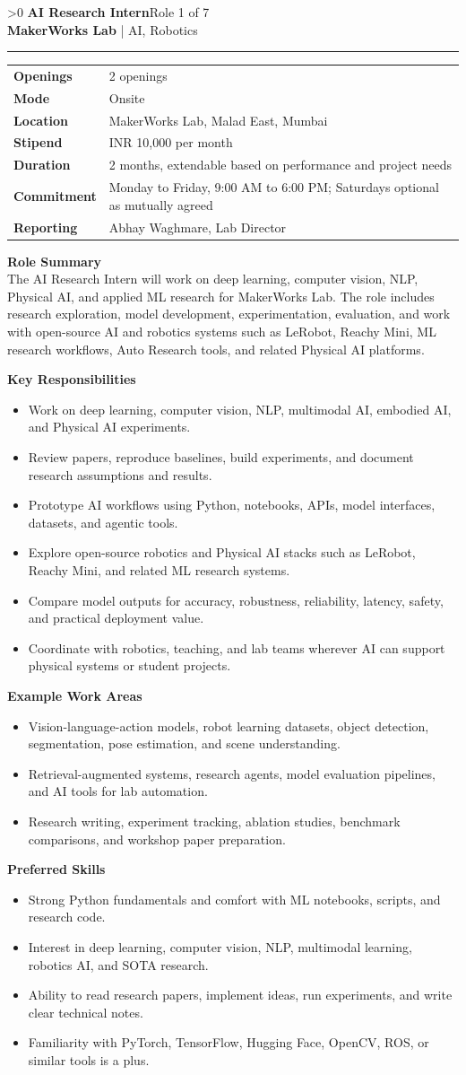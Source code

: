 \documentclass[10pt,a4paper]{article}
\newcommand{\CommonLocation}{MakerWorks Lab, Malad East, Mumbai}
\newcommand{\CommonStipend}{INR 10,000 per month}
\newcommand{\CommonDuration}{2 months, extendable based on performance and project needs}
\newcommand{\CommonCommitment}{Monday to Friday, 9:00 AM to 6:00 PM; Saturdays optional as mutually agreed}
\newcommand{\CommonReporting}{Abhay Waghmare, Lab Director}
\newcounter{rolepage}
\newcommand{\RolePage}[3]{%
  \ifnum\value{rolepage}>0\clearpage\fi
  \stepcounter{rolepage}
  \thispagestyle{plain}
  {\Large\textbf{#1}}\hfill{\small #2}\\
  {\small\textbf{MakerWorks Lab} | AI, Robotics}\\[4pt]
  \hrule
  \vspace{6pt}
  #3
}
\newcommand{\DetailsTable}[3]{%
\begin{tabularx}{\linewidth}{>{\bfseries}p{30mm}X}
Openings & #3 \\
Mode & #1 \\
Location & #2 \\
Stipend & \CommonStipend \\
Duration & \CommonDuration \\
Commitment & \CommonCommitment \\
Reporting & \CommonReporting \\
\end{tabularx}
}
\newcommand{\RoleSection}[1]{\vspace{5pt}\par\noindent\textbf{#1}\par\vspace{2pt}}
\begin{document}
\small

\RolePage{AI Research Intern}{Role 1 of 7}{
\DetailsTable{Onsite}{\CommonLocation}{2 openings}

\textbf{Role Summary}\\
The AI Research Intern will work on deep learning, computer vision, NLP, Physical AI, and applied ML research for MakerWorks Lab. The role includes research exploration, model development, experimentation, evaluation, and work with open-source AI and robotics systems such as LeRobot, Reachy Mini, ML research workflows, Auto Research tools, and related Physical AI platforms.

\RoleSection{Key Responsibilities}
\begin{itemize}
  \item Work on deep learning, computer vision, NLP, multimodal AI, embodied AI, and Physical AI experiments.
  \item Review papers, reproduce baselines, build experiments, and document research assumptions and results.
  \item Prototype AI workflows using Python, notebooks, APIs, model interfaces, datasets, and agentic tools.
  \item Explore open-source robotics and Physical AI stacks such as LeRobot, Reachy Mini, and related ML research systems.
  \item Compare model outputs for accuracy, robustness, reliability, latency, safety, and practical deployment value.
  \item Coordinate with robotics, teaching, and lab teams wherever AI can support physical systems or student projects.
\end{itemize}

\RoleSection{Example Work Areas}
\begin{itemize}
  \item Vision-language-action models, robot learning datasets, object detection, segmentation, pose estimation, and scene understanding.
  \item Retrieval-augmented systems, research agents, model evaluation pipelines, and AI tools for lab automation.
  \item Research writing, experiment tracking, ablation studies, benchmark comparisons, and workshop paper preparation.
\end{itemize}

\RoleSection{Preferred Skills}
\begin{itemize}
  \item Strong Python fundamentals and comfort with ML notebooks, scripts, and research code.
  \item Interest in deep learning, computer vision, NLP, multimodal learning, robotics AI, and SOTA research.
  \item Ability to read research papers, implement ideas, run experiments, and write clear technical notes.
  \item Familiarity with PyTorch, TensorFlow, Hugging Face, OpenCV, ROS, or similar tools is a plus.
\end{itemize}

}
\end{document}
